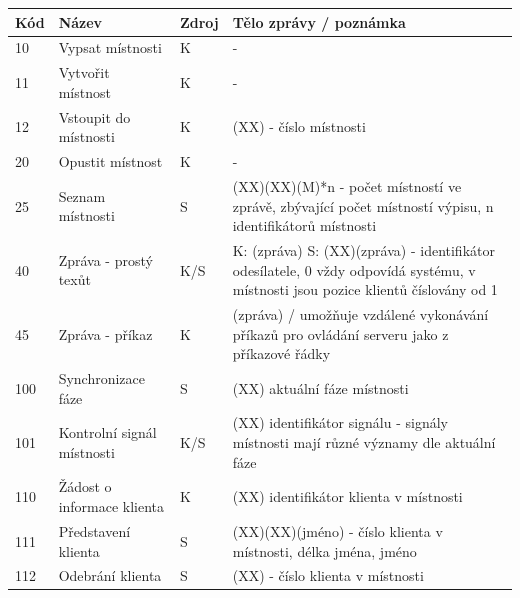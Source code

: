 \documentclass[12pt,a4paper]{article}
\begin{document}
\begin{table}[h]
\center
\begin{tabular}{|l|p{3cm}|l|p{10cm}|}
\hline
\textbf{Kód} & \textbf{Název} & \textbf{Zdroj} & \textbf{Tělo zprávy / poznámka}\\ \hline
10 & Vypsat místnosti & K & - \\ \hline
11 & Vytvořit místnost & K & - \\ \hline
12 & Vstoupit do místnosti & K & (XX) - číslo místnosti \\ \hline
20 & Opustit místnost & K & - \\ \hline
25 & Seznam místnosti & S & (XX)(XX)(M)*n - počet místností ve zprávě, zbývající počet místností výpisu, n identifikátorů místnosti \\ \hline
40 & Zpráva - prostý texůt & K/S & K: (zpráva) \newline S: (XX)(zpráva) - identifikátor odesílatele, 0 vždy odpovídá systému, v místnosti jsou pozice klientů číslovány od 1 \\ \hline
45 & Zpráva - příkaz & K & (zpráva) / umožňuje vzdálené vykonávání příkazů pro ovládání serveru jako z příkazové řádky \\ \hline
100 & Synchronizace fáze & S & (XX) aktuální fáze místnosti \\ \hline
101 & Kontrolní signál místnosti & K/S & (XX) identifikátor signálu - signály místnosti mají různé významy dle aktuální fáze\\ \hline
110 & Žádost o informace klienta & K & (XX) identifikátor klienta v místnosti \\ \hline
111 & Představení klienta & S & (XX)(XX)(jméno) - číslo klienta v místnosti, délka jména, jméno \\ \hline
112 & Odebrání klienta & S & (XX) - číslo klienta v místnosti \\ \hline

\end{tabular}
\end{table}
\end{document}
